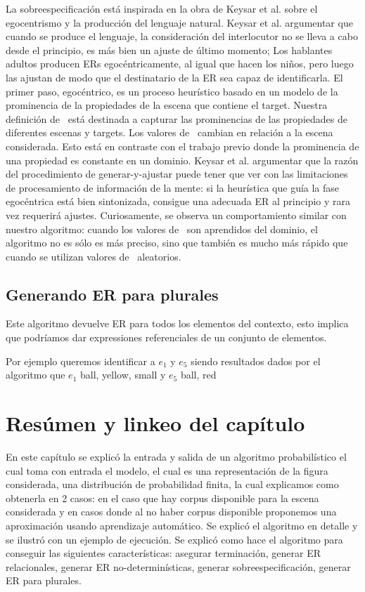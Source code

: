 La sobreespecificaci\'on est\'a inspirada en la obra de Keysar et al. \cite{keysar:Curr98} sobre el egocentrismo y la producci\'on del lenguaje natural. 
Keysar et al. argumentar que cuando se produce el lenguaje, la consideraci\'on del interlocutor no se lleva a cabo desde el principio, 
es m\'as bien un ajuste de \'ultimo momento; Los hablantes adultos producen ERs egoc\'entricamente, al igual que hacen los ni\~nos, 
pero luego las ajustan de modo que el destinatario de la ER sea capaz de identificarla. El primer paso, egoc\'entrico, es un proceso
heur\'istico basado en un modelo de la prominencia de la propiedades de la escena que contiene el target. Nuestra definici\'on de
\puse\ est\'a destinada a capturar las prominencias de las propiedades de diferentes escenas y targets. Los valores de \puse\
cambian en relaci\'on a la escena considerada. Esto est\'a en contraste con el trabajo previo donde
la prominencia de una propiedad es constante en un dominio. Keysar et al. argumentar que la raz\'on del procedimiento de 
generar-y-ajustar puede tener que ver con las limitaciones de procesamiento de informaci\'on de la
mente: si la heur\'istica que gu\'ia la fase egoc\'entrica est\'a bien sintonizada, consigue una adecuada ER al principio
y rara vez requerir\'a ajustes. Curiosamente, se observa un comportamiento similar
con nuestro algoritmo: cuando los valores de \puse\ son
aprendidos del dominio, el algoritmo no es
s\'olo es m\'as preciso, sino que tambi\'en es mucho m\'as r\'apido que cuando se utilizan valores de \puse\ aleatorios.


\subsection{Generando ER para plurales}

Este algoritmo devuelve ER para todos los elementos del contexto, 
esto implica que podr\'iamos dar expressiones referenciales de un conjunto de elementos.

Por ejemplo queremos identificar a $e_1$ y $e_5$ 
siendo resultados dados por el algoritmo que $e_1$
ball, yellow, small
y $e_5$ ball, red


\section{Res\'umen y linkeo del cap\'itulo}
\label{sec:link-algoritmo}

En este cap\'itulo se explic\'o la entrada y salida de un algoritmo probabil\'istico el cual toma con entrada el modelo, el cual es una representaci\'on de la figura considerada, una distribuci\'on de probabilidad finita, la cual explicamos como obtenerla en 2 casos: en el caso que hay corpus disponible para la escena considerada y en casos donde al no haber corpus disponible proponemos una aproximaci\'on usando aprendizaje autom\'atico. Se explic\'o el algoritmo en detalle y se ilustr\'o con un ejemplo de ejecuci\'on. Se explic\'o como hace el algoritmo para conseguir las siguientes caracter\'isticas: asegurar terminaci\'on, generar ER relacionales, generar ER no-determin\'isticas, generar sobreespecificaci\'on, generar ER para plurales.

